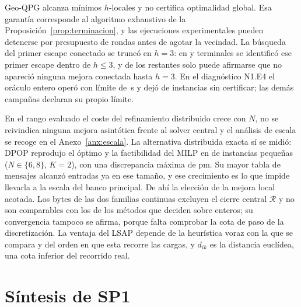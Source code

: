\documentclass[12pt,a4paper]{article}
\theoremstyle{remark}
\theoremstyle{plain}
\begin{document}
Geo-QPG alcanza mínimos $h$-locales y no certifica optimalidad global. Esa
garantía corresponde al algoritmo exhaustivo de la Proposición~\ref{prop:terminacion},
y las ejecuciones experimentales pueden detenerse por presupuesto de rondas antes
de agotar la vecindad. La búsqueda del primer escape conectado se truncó en $h=3$: en
\NFourHStarTwoN{} y \NFourHStarThreeN{} terminales se identificó ese primer
escape dentro de $h\le3$, y de los \NFourHStarGtThreeN{} restantes solo puede
afirmarse que no apareció ninguna mejora conectada hasta $h=3$. En el diagnóstico N1.E4 el oráculo entero operó con límite de
\NOneMilpTimeLimitSec\,s y dejó \NOneMilpUncertifiedCount{} de
\NOneMilpAudits{} instancias sin certificar; las demás campañas declaran su propio
límite.

En el rango evaluado el coste del refinamiento distribuido crece con $N$, no se
reivindica ninguna mejora asintótica frente al solver central y el análisis de
escala se recoge en el Anexo~\ref{anx:escala}. La alternativa distribuida exacta sí se
midió: DPOP \citep{petcuFaltings2005DPOP} reprodujo el óptimo y la factibilidad
del MILP en \NFourDpopRuns{} de \NFourDpopRuns{} instancias pequeñas
($N\in\{6,8\}$, $K=2$), con una discrepancia máxima de \NFourDpopMaxDeltaPm{} pm. Su mayor tabla de mensajes alcanzó
\NFourDpopMaxTable{} entradas ya en ese tamaño, y ese crecimiento es lo que
impide llevarla a la escala del banco principal. De ahí la elección de la mejora
local acotada. Los bytes de las dos familias continuas excluyen el cierre central
$\mathcal R$ y no son comparables con los de los métodos que deciden sobre
enteros; su convergencia tampoco se afirma, porque falta comprobar la cota de
paso de la discretización. La ventaja del LSAP depende de la heurística voraz con
la que se compara y del orden en que esta recorre las cargas, y $d_{ik}$ es la
distancia euclídea, una cota inferior del recorrido real.


\enlargethispage{4\baselineskip}
\section{Síntesis de SP1}
\end{document}
